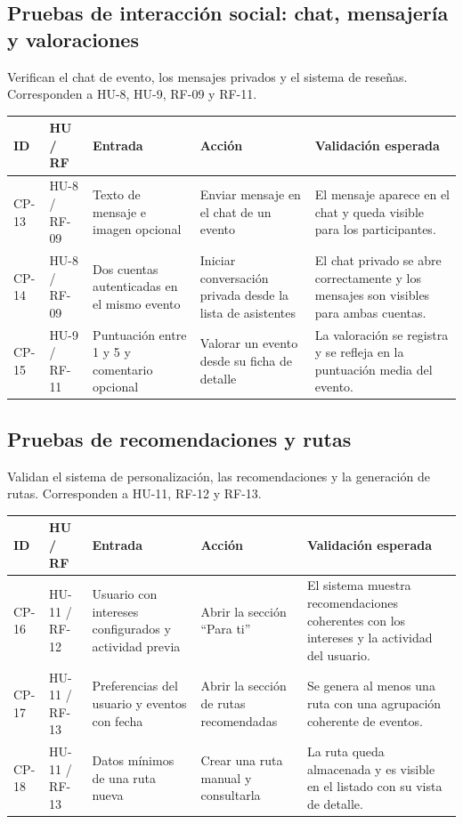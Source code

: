 \subsection{Pruebas de interacción social: chat, mensajería y valoraciones}

Verifican el chat de evento, los mensajes privados y el sistema de reseñas. Corresponden a HU-8, HU-9, RF-09 y RF-11.

\begin{longtable}{|p{1.3cm}|p{1.6cm}|p{3cm}|p{3.8cm}|p{4.3cm}|}
\hline
\textbf{ID} & \textbf{HU / RF} & \textbf{Entrada} & \textbf{Acción} & \textbf{Validación esperada} \\
\hline
{}\label{cp:13}CP-13 & HU-8 / RF-09 & Texto de mensaje e imagen opcional & Enviar mensaje en el chat de un evento & El mensaje aparece en el chat y queda visible para los participantes. \\
\hline
{}\label{cp:14}CP-14 & HU-8 / RF-09 & Dos cuentas autenticadas en el mismo evento & Iniciar conversación privada desde la lista de asistentes & El chat privado se abre correctamente y los mensajes son visibles para ambas cuentas. \\
\hline
{}\label{cp:15}CP-15 & HU-9 / RF-11 & Puntuación entre 1 y 5 y comentario opcional & Valorar un evento desde su ficha de detalle & La valoración se registra y se refleja en la puntuación media del evento. \\
\hline
\end{longtable}

\subsection{Pruebas de recomendaciones y rutas}

Validan el sistema de personalización, las recomendaciones y la generación de rutas. Corresponden a HU-11, RF-12 y RF-13.

\begin{longtable}{|p{1.3cm}|p{1.6cm}|p{3cm}|p{3.8cm}|p{4.3cm}|}
\hline
\textbf{ID} & \textbf{HU / RF} & \textbf{Entrada} & \textbf{Acción} & \textbf{Validación esperada} \\
\hline
{}\label{cp:16}CP-16 & HU-11 / RF-12 & Usuario con intereses configurados y actividad previa & Abrir la sección ``Para ti'' & El sistema muestra recomendaciones coherentes con los intereses y la actividad del usuario. \\
\hline
{}\label{cp:17}CP-17 & HU-11 / RF-13 & Preferencias del usuario y eventos con fecha & Abrir la sección de rutas recomendadas & Se genera al menos una ruta con una agrupación coherente de eventos. \\
\hline
{}\label{cp:18}CP-18 & HU-11 / RF-13 & Datos mínimos de una ruta nueva & Crear una ruta manual y consultarla & La ruta queda almacenada y es visible en el listado con su vista de detalle. \\
\hline
\end{longtable}

